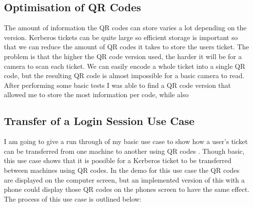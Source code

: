 \documentclass[]{report}   %
\begin{document}
\subsection{Optimisation of QR Codes}
The amount of information the QR codes can store varies a lot depending on the version. Kerberos tickets can be quite large so efficient storage is important so that we can reduce the amount of QR codes it takes to store the users ticket. The problem is that the higher the QR code version used, the harder it will be for a camera to scan each ticket. We can easily encode a whole ticket into a single QR code, but the resulting QR code is almost impossible for a basic camera to read. After performing some basic tests I was able to find a QR code version that allowed me to store the most information per code, while also 


\subsection{Transfer of a Login Session Use Case}
I am going to give a run through of my basic use case to show how a user’s ticket can be transferred from one machine to another using QR codes . Though basic, this use case shows that it is possible for a Kerberos ticket to be transferred between machines using QR codes. In the demo for this use case the QR codes are displayed on the computer screen, but an implemented version of this with a phone could display those QR codes on the phones screen to have the same effect. The process of this use case is outlined below:


\end{document}
